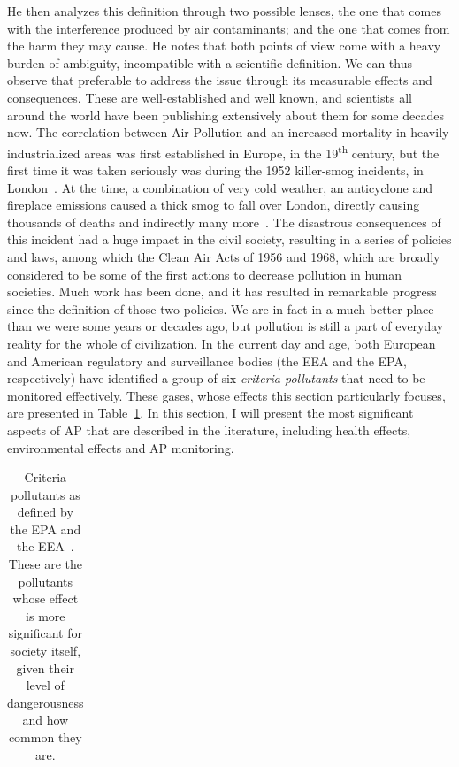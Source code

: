 He then analyzes this definition through two possible lenses, the one
that comes with the interference produced by air contaminants; and the
one that comes from the harm they may cause. He notes that both points
of view come with a heavy burden of ambiguity, incompatible with a
scientific definition. We can thus observe that preferable to address
the issue through its measurable effects and consequences. These are
well-established and well known, and scientists all around the world
have been publishing extensively about them for some decades now. The
correlation between Air Pollution and an increased mortality in heavily
industrialized areas was first established in Europe, in the
19\textsuperscript{th} century, but the first time it was taken
seriously was during the 1952 killer-smog incidents, in
London~\cite{Platt2007}. At the time, a combination of very cold
weather, an anticyclone and fireplace emissions caused a thick smog to
fall over London, directly causing thousands of deaths and indirectly
many more~\cite{Bell2008,Office2019}. The disastrous consequences of
this incident had a huge impact in the civil society, resulting in a
series of policies and laws, among which the Clean Air Acts of 1956 and
1968, which are broadly considered to be some of the first actions to
decrease pollution in human societies. Much work has been done, and it
has resulted in remarkable progress since the definition of those two
policies. We are in fact in a much better place than we were some years
or decades ago, but pollution is still a part of everyday reality for
the whole of civilization. In the current day and age, both European and
American regulatory and surveillance bodies (the \gls{EEA} and the
\gls{EPA}, respectively) have identified a group of six \emph{criteria
pollutants} that need to be monitored effectively. These gases, whose
effects this section particularly focuses, are presented in
Table~\ref{tab:criteria_pollutants}. In this section, I will present the
most significant aspects of \gls{AP} that are described in the
literature, including health effects, environmental effects and
\acrlong{AP} monitoring.

\begin{table}[htpb]
    \centering
    \caption{Criteria pollutants as defined by the EPA and the
    EEA~\cite{CABI2019}. These are the pollutants whose effect is more
    significant for society itself, given their level of dangerousness and
    how common they are.}
    \label{tab:criteria_pollutants}
    \begin{tabular}{c}
    
    \end{tabular}
\end{table}

